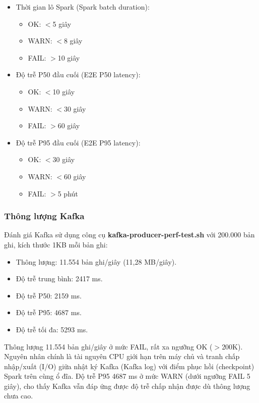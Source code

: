 \documentclass[../BTL.tex]{subfiles}
\begin{document}
\begin{itemize}
\begin{itemize}
        \item WARN: $<$0,8
        \item FAIL: $\ge$1,0
    \end{itemize}
    \item Thời gian lô Spark (Spark batch duration):
    \begin{itemize}
        \item OK: $<$5 giây
        \item WARN: $<$8 giây
        \item FAIL: $>$10 giây
    \end{itemize}
    \item Độ trễ P50 đầu cuối (E2E P50 latency):
    \begin{itemize}
        \item OK: $<$10 giây
        \item WARN: $<$30 giây
        \item FAIL: $>$60 giây
    \end{itemize}
    \item Độ trễ P95 đầu cuối (E2E P95 latency):
    \begin{itemize}
        \item OK: $<$30 giây
        \item WARN: $<$60 giây
        \item FAIL: $>$5 phút
    \end{itemize}
\end{itemize}

\subsubsection{Thông lượng Kafka}
Đánh giá Kafka sử dụng công cụ \textbf{kafka-producer-perf-test.sh} với 200.000 bản ghi, kích thước 1KB mỗi bản ghi:
\begin{itemize}
    \item Thông lượng: 11.554 bản ghi/giây (11,28 MB/giây).
    \item Độ trễ trung bình: 2417 ms.
    \item Độ trễ P50: 2159 ms.
    \item Độ trễ P95: 4687 ms.
    \item Độ trễ tối đa: 5293 ms.
\end{itemize}
Thông lượng 11.554 bản ghi/giây ở mức FAIL, rất xa ngưỡng OK ($>$200K). Nguyên nhân chính là tài nguyên CPU giới hạn trên máy chủ và tranh chấp nhập/xuất (I/O) giữa nhật ký Kafka (Kafka log) với điểm phục hồi (checkpoint) Spark trên cùng ổ đĩa. Độ trễ P95 4687 ms ở mức WARN (dưới ngưỡng FAIL 5 giây), cho thấy Kafka vẫn đáp ứng được độ trễ chấp nhận được dù thông lượng chưa cao.
\end{document}
